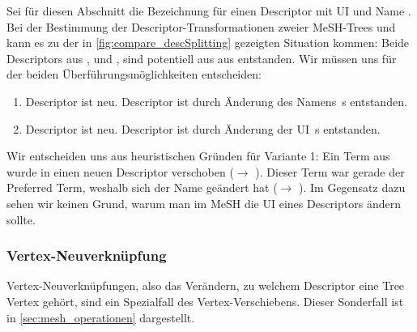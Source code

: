 Sei  für diesen Abschnitt die Bezeichnung für einen Descriptor mit UI  und Name . Bei der Bestimmung der Descriptor-Transformationen zweier MeSH-Trees  und  kann es zu der in \autoref{fig:compare_descSplitting} gezeigten Situation kommen: Beide Descriptors aus ,  und , sind potentiell aus  aus  entstanden. Wir müssen uns für der beiden Überführungsmöglichkeiten entscheiden:

\begin{enumerate}
  \item Descriptor  ist neu. Descriptor  ist durch Änderung des Namens \,s entstanden.
  \item Descriptor  ist neu. Descriptor  ist durch Änderung der UI \,s entstanden.
\end{enumerate}

Wir entscheiden uns aus heuristischen Gründen für Variante 1: Ein Term aus  wurde in einen neuen Descriptor verschoben ($\rightarrow$ ). Dieser Term war gerade der Preferred Term, weshalb sich der Name geändert hat ($\rightarrow$ ). Im Gegensatz dazu sehen wir keinen Grund, warum man im MeSH die UI eines Descriptors ändern sollte.  

\subsubsection{Vertex-Neuverknüpfung}
Vertex-Neuverknüpfungen, also das Verändern, zu welchem Descriptor eine Tree Vertex gehört, sind ein Spezialfall des Vertex-Verschiebens. Dieser Sonderfall ist in \ref{sec:mesh_operationen} \textit{} dargestellt.


